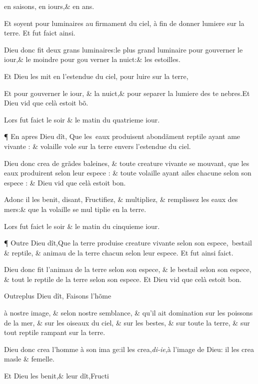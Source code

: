 \documentclass[twocolumn,paper=a4,pagesize=pdftex,12pt,headinclude=on]{scrbook}
\newcounter{verse}
\newcommand{\bverse}{%
  \linebreak
  \addtocounter{verse}{1}
  \theverse\quad
}
\begin{document}
\pagebreak

\footnotemarkmain{} en saisons,
\footnotemarkmain{}en iours,\& en ans.
\bverse Et soyent pour luminaires au firma\-ment
du ciel, à fin de donner lumiere
sur la terre. Et fut faict ainsi.
\bverse Dieu donc fit deux grans luminai\-res:le
 plus grand luminaire pour
\footnotemarkmain{} gouverner le iour,\& le moindre
pour gou \linebreak
verner la nuict:\& les estoilles.
\bverse Et Dieu les mit en l'estendue du ciel,
pour luire sur la terre,
\bverse Et pour gouverner le iour, \& la
nuict,\& pour separer la lumiere des te \linebreak
nebres.Et Dieu vid que celà estoit b\~o.
\bverse Lors fut faict le soir \& le matin du
quatrieme iour.
\bverse ¶ En apres Dieu dît, Que les~eaux
produisent abond\~ament
\footnotemarkmain{}reptile ayant ame
vivante : \& volaille vole sur la ter\-re
envers l'estendue du ciel.
\bverse Dieu donc
\footnotemarkmain{}crea de gr\~ades baleines,
\& toute creature vivante se mouvant,
que les eaux produirent selon leur es\-pece :
\& toute volaille ayant ailes chacune selon son espece : 
\& Dieu vid \linebreak
 que celà estoit bon.
\bverse Adonc \footnotemarkmain{}il les benit, disant, Fructi\-fiez,
\& multipliez, \& remplissez les
eaux des mers:\& que la volaille se mul \linebreak
tiplie en la terre.
\bverse Lors fut faict le soir \& le matin du
cinquieme iour.
\bverse ¶ Outre Dieu dît,Que la terre produise
creature vivante selon son espe\-ce,~bestail
 \& reptile, \& animau de la
terre chacun selon leur espece. Et fut
ainsi faict.
\bverse Dieu donc fit l'animau de la terre
selon son espece, \& le bestail selon son
espece, \& tout le reptile de la terre se\-lon
son espece. Et Dieu vid que celà
estoit bon.
\bverse Outreplus Dieu dît,
\footnotemarkmain{}Faisons
\footnotemarkmain{}l'h\~o\-me
\addtocounter{footnotemain}{1}%
à \footnotemarkverse{}\footnotemarkmain{} nostre image,
\& selon nostre
semblance, \& qu'il ait domination sur
les poissons de la mer, \& sur les oi\-seaux
du ciel, \& sur les bestes, \& sur
toute la terre, \& sur tout reptile ram\-pant
sur la terre.
\addtocounter{footnotemain}{1}%
\bverse Dieu donc crea l'homme à son ima \linebreak
ge:\footnotemarkverse{}\footnotemarkmain{}il les
crea,\emph{di-ie},à l'image de Dieu:
\footnotemarkverse{}il les crea masle \& femelle.
\bverse Et Dieu les benit,\& leur dît,\footnotemarkmain{}Fructi\linebreak
\end{document}
